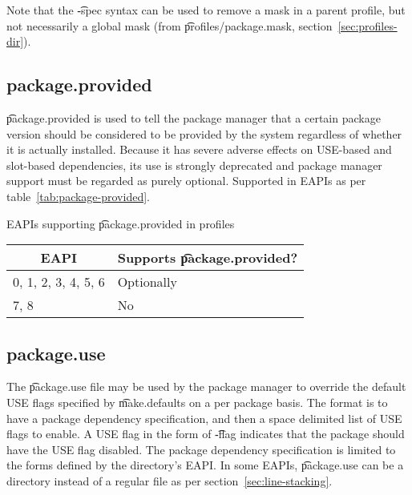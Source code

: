 Note that the \t{-spec} syntax can be used to remove a mask in a parent profile, but not
necessarily a global mask (from \t{profiles/package.mask}, section~\ref{sec:profiles-dir}).


\subsection{package.provided}
 \t{package.provided} is used to tell the package manager that
a certain package version should be considered to be provided by the system regardless of whether
it is actually installed. Because it has severe adverse effects on USE-based and slot-based
dependencies, its use is strongly deprecated and package manager support must be regarded as purely
optional. Supported in EAPIs as per table~\ref{tab:package-provided}.

\begin{centertable}{EAPIs supporting \t{package.provided} in profiles}
    \label{tab:package-provided}
    \begin{tabular}{ll}
      \toprule
      \multicolumn{1}{c}{\textbf{EAPI}} &
      \multicolumn{1}{c}{\textbf{Supports \t{package.provided}?}} \\
      \midrule
      0, 1, 2, 3, 4, 5, 6 & Optionally \\
      7, 8                & No         \\
      \bottomrule
    \end{tabular}
\end{centertable}

\subsection{package.use}
The \t{package.use} file may be used by the package manager to override the default USE flags
specified by \t{make.defaults} on a per package basis. The format is to have a package dependency
specification, and then a space delimited list of USE flags to enable. A USE flag in the form of
\t{-flag} indicates that the package should have the USE flag disabled. The package dependency
specification is limited to the forms defined by the directory's EAPI\@. In some EAPIs,
\t{package.use} can be a directory instead of a regular file as per section~\ref{sec:line-stacking}.

